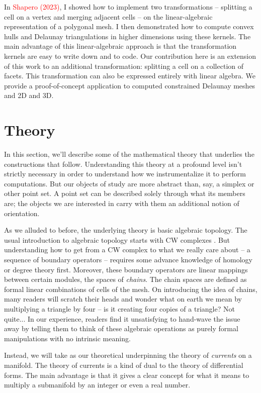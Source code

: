 \documentclass[twocolumn]{article}
\begin{document}
In \textcolor{red}{Shapero (2023)}, I showed how to implement two transformations -- splitting a cell on a vertex and merging adjacent cells -- on the linear-algebraic representation of a polygonal mesh.
I then demonstrated how to compute convex hulls and Delaunay triangulations in higher dimensions using these kernels.
The main advantage of this linear-algebraic approach is that the transformation kernels are easy to write down and to code.
Our contribution here is an extension of this work to an additional transformation: splitting a cell on a collection of facets.
This transformation can also be expressed entirely with linear algebra.
We provide a proof-of-concept application to computed constrained Delaunay meshes and 2D and 3D.


\section{Theory}

In this section, we'll describe some of the mathematical theory that underlies the constructions that follow.
Understanding this theory at a profound level isn't strictly necessary in order to understand how we instrumentalize it to perform computations.
But our objects of study are more abstract than, say, a simplex or other point set.
A point set can be described solely through what its members are; the objects we are interested in carry with them an additional notion of orientation.

As we alluded to before, the underlying theory is basic algebraic topology.
The usual introduction to algebraic topology starts with CW complexes \cite{hatcher2002algebraic}.
But understanding how to get from a CW complex to what we really care about -- a sequence of boundary operators -- requires some advance knowledge of homology or degree theory first.
Moreover, these boundary operators are linear mappings between certain modules, the spaces of \emph{chains}.
The chain spaces are defined as formal linear combinations of cells of the mesh.
On introducing the idea of chains, many readers will scratch their heads and wonder what on earth we mean by multiplying a triangle by four -- is it creating four copies of a triangle?
Not quite...
In our experience, readers find it unsatisfying to hand-wave the issue away by telling them to think of these algebraic operations as purely formal manipulations with no intrinsic meaning.

Instead, we will take as our theoretical underpinning the theory of \emph{currents} on a manifold.
The theory of currents is a kind of dual to the theory of differential forms.
The main advantage is that it gives a clear concept for what it means to multiply a submanifold by an integer or even a real number.
\end{document}
